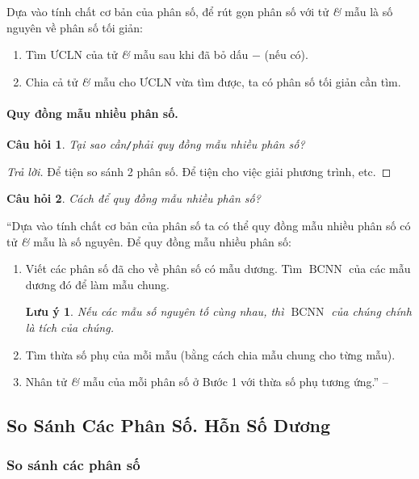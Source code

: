 \documentclass{article}
\numberwithin{equation}{section}
\newtheorem{remark}{Lưu ý}[section]
\newtheorem{question}{Câu hỏi}[section]
\begin{document}
Dựa vào tính chất cơ bản của phân số, để rút gọn phân số với tử \textit{\&} mẫu là số nguyên về phân số tối giản:
\begin{enumerate}
	\item Tìm $\mbox{ƯCLN}$ của tử \textit{\&} mẫu sau khi đã bỏ dấu $-$ (nếu có).
	\item Chia cả tử \textit{\&} mẫu cho $\mbox{ƯCLN}$ vừa tìm được, ta có phân số  tối giản cần tìm.
\end{enumerate}

\paragraph{Quy đồng mẫu nhiều phân số.}
\begin{question}
	Tại sao cần\emph{\texttt{/}}phải quy đồng mẫu nhiều phân số?
\end{question}

\begin{proof}[Trả lời]
	Để tiện so sánh 2 phân số. Để tiện cho việc giải phương trình, etc.
\end{proof}

\begin{question}
	Cách để quy đồng mẫu nhiều phân số?
\end{question}
``Dựa vào tính chất cơ bản của phân số ta có thể quy đồng mẫu nhiều phân số có tử \textit{\&} mẫu là số nguyên. Để quy đồng mẫu nhiều phân số:
\begin{enumerate}
	\item Viết các phân số đã cho về phân số có mẫu dương. Tìm $\operatorname{BCNN}$ của các mẫu dương đó để làm mẫu chung.
	\begin{remark}
		Nếu các mẫu số nguyên tố cùng nhau, thì $\operatorname{BCNN}$ của chúng chính là tích của chúng.
	\end{remark}
	\item Tìm thừa số phụ của mỗi mẫu (bằng cách chia mẫu chung cho từng mẫu).
	\item Nhân tử \textit{\&} mẫu của mỗi phân số ở Bước 1 với thừa số phụ tương ứng.'' -- \cite[p. 29]{Thai_Anh_Dat_Ha_Loan_Nam_Quang_Toan_6_tap_2}
\end{enumerate}

\subsection{So Sánh Các Phân Số. Hỗn Số Dương}

\subsubsection{So sánh các phân số}
\end{document}
